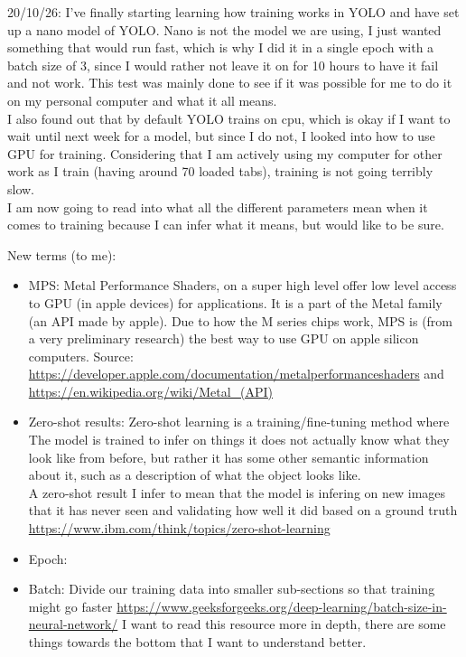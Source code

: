 \documentclass[12pt]{article}
\begin{document}
20/10/26: I've finally starting learning how training works in YOLO and have set up a nano model of YOLO. Nano is not the model we are using, I just wanted something that would run fast, which is why I did it in a single epoch with a batch size of 3, since I would rather not leave it on for 10 hours to have it fail and not work. This test was mainly done to see if it was possible for me to do it on my personal computer and what it all means. \\
I also found out that by default YOLO trains on cpu, which is okay if I want to wait until next week for a model, but since I do not, I looked into how to use GPU for training. Considering that I am actively using my computer for other work as I train (having around 70 loaded tabs), training is not going terribly slow.\\
I am now going to read into what all the different parameters mean when it comes to training because I can infer what it means, but would like to be sure.

New terms (to me): 
\begin{itemize}
    \item MPS: Metal Performance Shaders, on a super high level offer low level access to GPU (in apple devices) for applications. It is a part of the Metal family (an API made by apple). Due to how the M series chips work, MPS is (from a very preliminary research) the best way to use GPU on apple silicon computers. Source: \url{https://developer.apple.com/documentation/metalperformanceshaders} and \url{https://en.wikipedia.org/wiki/Metal_(API)}
    \item Zero-shot results: Zero-shot learning is a training/fine-tuning method where The model is trained to infer on things it does not actually know what they look like from before, but rather it has some other semantic information about it, such as a description of what the object looks like. \\ A zero-shot result I infer to mean that the model is infering on new images that it has never seen and validating how well it did based on a ground truth  \url{https://www.ibm.com/think/topics/zero-shot-learning}
    \item Epoch:
    \item Batch: Divide our training data into smaller sub-sections so that training might go faster \url{https://www.geeksforgeeks.org/deep-learning/batch-size-in-neural-network/} I want to read this resource more in depth, there are some things towards the bottom that I want to understand better.
\end{itemize}
\end{document}
